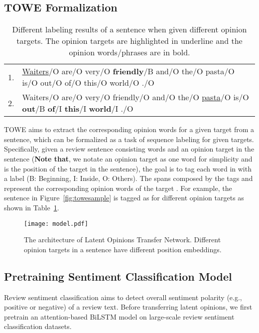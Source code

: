 \documentclass[letterpaper]{article} \usepackage{aaai20}  \usepackage{times}  \usepackage{helvet} \usepackage{courier}  \usepackage[hyphens]{url}  \usepackage{graphicx} \urlstyle{rm} \def\UrlFont{\rm}  \usepackage{graphicx}
\begin{document}
\subsection{TOWE Formalization}
\begin{table}[ht]
	\small
	\centering
	\caption{Different labeling results of a sentence when given different opinion targets. The opinion targets are highlighted in underline and the opinion words/phrases are in bold.}
	\label{taskdefinition}
	\begin{tabular}{c p{7.2cm}}
		\hline
		1. & \textrm{\underline{Waiters}/O are/O very/O \textbf{friendly}/B and/O the/O pasta/O is/O out/O of/O this/O world/O ./O} \\
		2. & \textrm{Waiters/O are/O very/O friendly/O and/O the/O \underline{pasta}/O is/O \textbf{out}/B \textbf{of}/I \textbf{this}/I \textbf{world}/I ./O} \\
		\hline
	\end{tabular}
\end{table}
TOWE aims to extract the corresponding opinion words for a given target from a sentence, which can be formalized as a task of sequence labeling for given targets. Specifically, given a review sentence  consisting  words and an opinion target   in the sentence  (\textbf{Note that}, we notate an opinion target as one word for simplicity and  is the position of the target in the sentence), the goal is to tag each word  in  with a label  (B: Beginning, I: Inside, O: Others). The spans composed by the tags  and  represent the corresponding opinion words of the target . For example, the sentence in Figure~\ref{fig:towesample} is tagged as  for different opinion targets as shown in Table~\ref{taskdefinition}.
\begin{figure*}[t]
	\centering
	\texttt{[image: model.pdf]}
	\caption{The architecture of Latent Opinions Transfer Network. Different opinion targets in a sentence have different position embeddings.}
	\label{fig:model}
\end{figure*}

\subsection{Pretraining Sentiment Classification Model}
Review sentiment classification aims to detect overall sentiment polarity (e.g., positive or negative) of a review text. Before transferring latent opinions, we first pretrain an attention-based BiLSTM model on large-scale review sentiment classification datasets.
\end{document}
